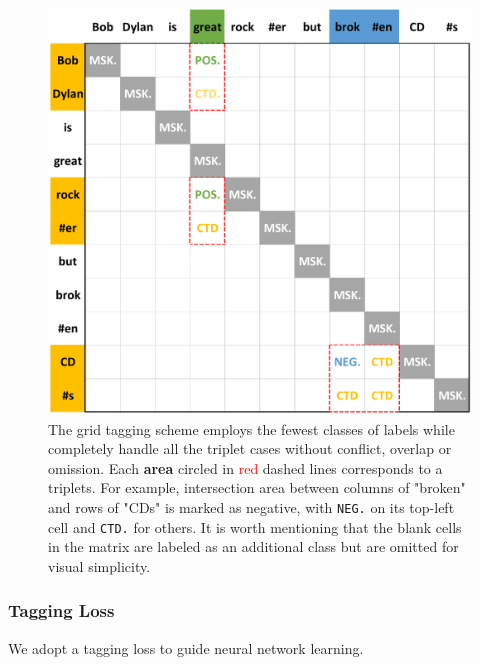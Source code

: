 \documentclass[11pt]{article}
\begin{document}
\begin{figure}[ht]
    \centering
    \includegraphics[width=1\linewidth]{fig_grid.pdf}
    \caption{The grid tagging scheme employs the fewest classes of labels while completely handle all the triplet cases without conflict, overlap or omission. Each \textbf{area} circled in \textcolor{red}{red} dashed lines corresponds to a triplets. For example, %
    intersection area between columns of "broken" and rows of "CDs" is marked as negative, with \texttt{NEG.} on its top-left cell and \texttt{CTD.} for others. It is worth mentioning that the blank cells in the matrix are labeled as an additional class but are omitted for visual simplicity.}
    \label{fig_grid.pdf}
\end{figure}



\subsubsection{Tagging Loss}

We adopt a tagging loss to guide neural network learning.  
\end{document}
